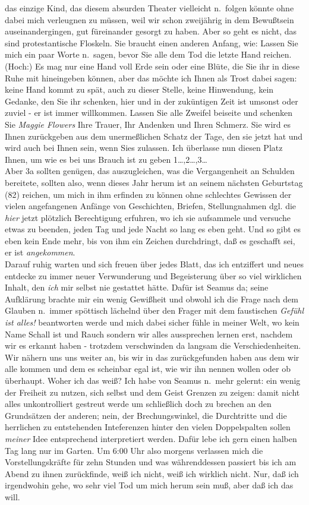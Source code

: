 \documentclass[
]{article}
\begin{document}
das einzige Kind, das diesem absurden Theater vielleicht n.~folgen
könnte ohne dabei mich verleugnen zu müssen, weil wir schon zweijährig
in dem Bewußtsein auseinandergingen, gut füreinander gesorgt zu haben.
Aber so geht es nicht, das sind protestantische Floskeln. Sie braucht
einen anderen Anfang, wie: Lassen Sie mich ein paar Worte n.~sagen,
bevor Sie alle dem Tod die letzte Hand reichen. (Hoch:) Es mag nur eine
Hand voll Erde sein oder eine Blüte, die Sie ihr in diese Ruhe mit
hineingeben können, aber das möchte ich Ihnen als Trost dabei sagen:
keine Hand kommt zu spät, auch zu dieser Stelle, keine Hinwendung, kein
Gedanke, den Sie ihr schenken, hier und in der zuküntigen Zeit ist
umsonst oder zuviel - er ist immer willkommen. Lassen Sie alle Zweifel
beiseite und schenken Sie \emph{Maggie Flowers} Ihre Trauer, Ihr
Andenken und Ihren Schmerz. Sie wird es Ihnen zurückgeben aus dem
unermeßlichen Schatz der Tage, den sie jetzt hat und wird auch bei Ihnen
sein, wenn Sies zulassen. Ich überlasse nun diesen Platz Ihnen, um wie
es bei uns Brauch ist zu geben 1\ldots,2\ldots,3\ldots{}\\
Aber 3a sollten genügen, das auszugleichen, was die Vergangenheit an
Schulden bereitete, sollten also, wenn dieses Jahr herum ist an seinem
nächsten Geburtstag (82) reichen, um mich in ihm erfinden zu können ohne
schlechtes Gewissen der vielen angefangenen Anfänge von Geschichten,
Briefen, Stellungnahmen dgl. die \emph{hier} jetzt plötzlich
Berechtigung erfuhren, wo ich sie aufsammele und versuche etwas zu
beenden, jeden Tag und jede Nacht so lang es eben geht. Und so gibt es
eben kein Ende mehr, bis von ihm ein Zeichen durchdringt, daß es
geschafft sei, er ist \emph{angekommen}.\\
Darauf ruhig warten und sich freuen über jedes Blatt, das ich entziffert
und neues entdecke zu immer neuer Verwunderung und Begeisterung über so
viel wirklichen Inhalt, den \emph{ich} mir selbst nie gestattet hätte.
Dafür ist Seamus da; seine Aufklärung brachte mir ein wenig Gewißheit
und obwohl ich die Frage nach dem Glauben n.~immer spöttisch lächelnd
über den Frager mit dem faustischen \emph{Gefühl ist alles!} beantworten
werde und mich dabei sicher fühle in meiner Welt, wo kein Name Schall
ist und Rauch sondern wir alles aussprechen lernen erst, nachdem wir es
erkannt haben - trotzdem verschwinden da langsam die Verschiedenheiten.
Wir nähern uns uns weiter an, bis wir in das zurückgefunden haben aus
dem wir alle kommen und dem es scheinbar egal ist, wie wir ihn nennen
wollen oder ob überhaupt. Woher ich das weiß? Ich habe von Seamus
n.~mehr gelernt: ein wenig der Freiheit zu nutzen, sich selbst und dem
Geist Grenzen zu zeigen: damit nicht alles unkontrolliert gestreut werde
um schließlich doch zu brechen an den Grundsätzen der anderen; nein, der
Brechungswinkel, die Durchtritte und die herrlichen zu entstehenden
Inteferenzen hinter den vielen Doppelspalten sollen \emph{meiner} Idee
entsprechend interpretiert werden. Dafür lebe ich gern einen halben Tag
lang nur im Garten. Um 6:00 Uhr also morgens verlassen mich die
Vorstellungskräfte für zehn Stunden und was währenddessen passiert bis
ich am Abend zu ihnen zurückfinde, weiß ich nicht, weiß ich wirklich
nicht. Nur, daß ich irgendwohin gehe, wo sehr viel Tod um mich herum
sein muß, aber daß ich das will.
\end{document}

